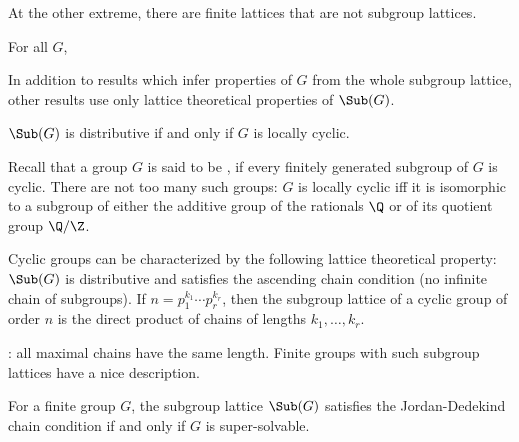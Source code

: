 \begin{frame}[fragile,label=MotivationExclude]{}
At the other extreme, there are finite lattices that are not subgroup lattices.
\vskip6mm
\begin{ex}
For all $G$,
\vskip1mm  \hskip25mm
\end{ex}
\end{frame}

\begin{frame}[fragile,label=Ore]{}
In addition to results which infer properties of $G$ from the
whole subgroup lattice, other results use only lattice
theoretical properties of $\Sub(G)$.
\vskip4mm
\begin{theorem}[Ore, 1937] 
$\Sub(G)$ is distributive if and only if $G$ is locally cyclic.
\end{theorem}
\end{frame}
\begin{frame}[fragile,label=Ore]{}
Recall that a group $G$ is said to be , if every finitely
generated subgroup of $G$ is cyclic. 
\vskip4mm
There are not too many such groups: $G$ is locally
cyclic iff it is isomorphic to a subgroup of either the additive group of
the rationals $\Q$ or of its quotient group $\Q/\Z$.
\end{frame}
\begin{frame}[fragile,label=Ore]{}
Cyclic groups can be characterized by the following lattice theoretical
property: $\Sub(G)$ is distributive
and satisfies the ascending chain condition (no infinite chain of subgroups).
\vskip4mm
If $n = p_1^{k_1}\cdots p_r^{k_r}$, then the subgroup lattice of
a cyclic group of order $n$ is the direct product of chains of lengths $k_1,
\dots, k_r$.
\end{frame}
\begin{frame}[fragile,label=Iwasawa]{}
: all maximal chains
have the same length. Finite groups with such subgroup lattices have a
nice description.
\vskip4mm
\begin{theorem}[Iwasawa, 1941]
For a finite group $G$, the subgroup lattice
$\Sub(G)$ satisfies the Jordan-Dedekind chain condition if and only if $G$ is
super-solvable.
\end{theorem}
\end{frame}

